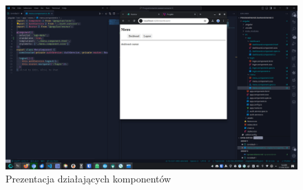 \documentclass[12pt]{article}
\begin{document}
\begin{figure}[H]
  \centering
  \includegraphics[width=1\textwidth,keepaspectratio]{image-17.png} \caption{Prezentacja działających komponentów}
  \label{fig:image-17}
\end{figure}
\vspace*{\fill}
\end{document}
